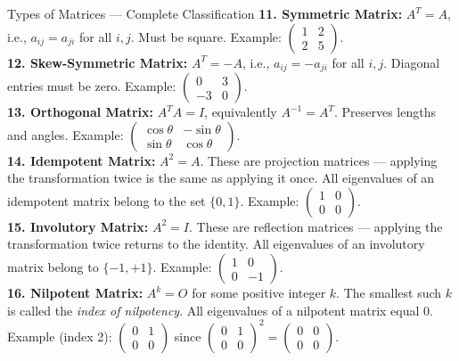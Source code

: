 \documentclass[12pt,a4paper]{article}
\begin{document}
\begin{infobox}{Types of Matrices --- Complete Classification}
\textbf{11. Symmetric Matrix:} $A^T = A$, i.e., $a_{ij} = a_{ji}$ for all $i, j$. Must be square. Example: $\begin{pmatrix} 1 & 2 \\ 2 & 5 \end{pmatrix}$. \\[2pt]
\textbf{12. Skew-Symmetric Matrix:} $A^T = -A$, i.e., $a_{ij} = -a_{ji}$ for all $i, j$. Diagonal entries must be zero. Example: $\begin{pmatrix} 0 & 3 \\ -3 & 0 \end{pmatrix}$. \\[2pt]
\textbf{13. Orthogonal Matrix:} $A^T A = I$, equivalently $A^{-1} = A^T$. Preserves lengths and angles. Example: $\begin{pmatrix} \cos\theta & -\sin\theta \\ \sin\theta & \cos\theta \end{pmatrix}$. \\[2pt]
\textbf{14. Idempotent Matrix:} $A^2 = A$. These are projection matrices --- applying the transformation twice is the same as applying it once. All eigenvalues of an idempotent matrix belong to the set $\{0, 1\}$. Example: $\begin{pmatrix} 1 & 0 \\ 0 & 0 \end{pmatrix}$. \\[2pt]
\textbf{15. Involutory Matrix:} $A^2 = I$. These are reflection matrices --- applying the transformation twice returns to the identity. All eigenvalues of an involutory matrix belong to $\{-1, +1\}$. Example: $\begin{pmatrix} 1 & 0 \\ 0 & -1 \end{pmatrix}$. \\[2pt]
\textbf{16. Nilpotent Matrix:} $A^k = O$ for some positive integer $k$. The smallest such $k$ is called the \emph{index of nilpotency}. All eigenvalues of a nilpotent matrix equal $0$. Example (index 2): $\begin{pmatrix} 0 & 1 \\ 0 & 0 \end{pmatrix}$ since $\begin{pmatrix} 0 & 1 \\ 0 & 0 \end{pmatrix}^2 = \begin{pmatrix} 0 & 0 \\ 0 & 0 \end{pmatrix}$.
\end{infobox}
\end{document}
